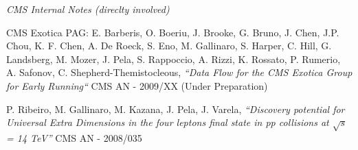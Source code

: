 \documentclass[10pt]{article}
\newenvironment{outerlist}[1][\enskip\textbullet]%
        {\begin{itemize}[#1]}{\end{itemize}%
         \vspace{-.6\baselineskip}}
\newenvironment{innerlist}[1][\enskip\textbullet]%
        {\begin{compactitem}[#1]}{\end{compactitem}}
\begin{document}
\begin{outerlist}
\item[] \textit{CMS Internal Notes (direclty involved)}

\begin{innerlist}
\item CMS Exotica PAG: E. Barberis, O. Boeriu, J. Brooke, G. Bruno, J. Chen, J.P. Chou, K. F. Chen, A. De Roeck, 
S. Eno, M. Gallinaro, S. Harper, C. Hill, G. Landsberg, M. Mozer, J. Pela, S. Rappoccio, 
A. Rizzi, K. Rossato, P. Rumerio, A. Safonov, C. Shepherd-Themistocleous, 
\emph{``Data Flow for the CMS Exotica Group for Early Running``} CMS AN - 2009/XX
(Under Preparation)
\item P. Ribeiro, M. Gallinaro, M. Kazana, J. Pela, J. Varela, \emph{“Discovery potential for Universal Extra
Dimensions in the four leptons final state in pp collisions at $\sqrt{s}$ = 14 TeV”} CMS AN - 2008/035 
\end{innerlist}


\end{outerlist}
\end{document}
